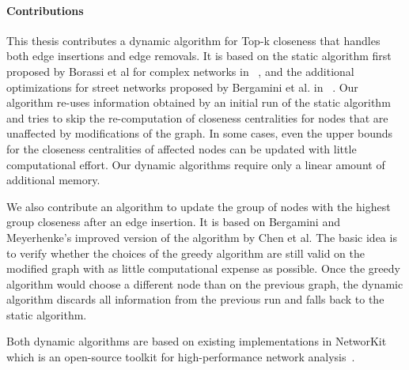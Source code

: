 \paragraph{Contributions}
This thesis contributes a dynamic algorithm for Top-k closeness that handles both edge insertions and edge removals. It is based on the static algorithm first proposed by Borassi et al for complex networks in ~\cite{borassi2015fast}, and the additional optimizations for street networks proposed by Bergamini et al. in ~\cite{bergamini2016computing}. Our algorithm re-uses information obtained by an initial run of the static algorithm and tries to skip the re-computation of closeness centralities for nodes that are unaffected by modifications of the graph. In some cases, even the upper bounds for the closeness centralities of affected nodes can be updated with little computational effort. Our dynamic algorithms require only a linear amount of additional memory.

We also contribute an algorithm to update the group of nodes with the highest group closeness after an edge insertion. It is based on Bergamini and Meyerhenke's improved version of the algorithm by Chen et al. The basic idea is to verify whether the choices of the greedy algorithm are still valid on the modified graph with as little computational expense as possible. Once the greedy algorithm would choose a different node than on the previous graph, the dynamic algorithm discards all information from the previous run and falls back to the static algorithm.

Both dynamic algorithms are based on existing implementations in NetworKit which is an open-source toolkit for high-performance network analysis~\cite{staudt2014networkit}.